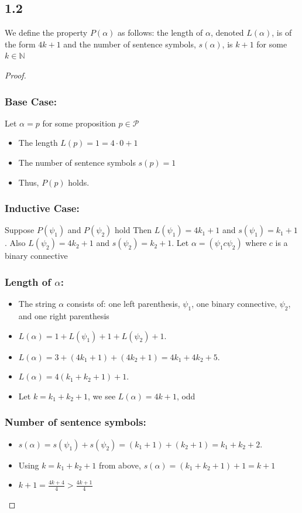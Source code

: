 \documentclass{article}
\begin{document}
\subsection*{1.2}

We define the property $P(\alpha)$ as follows: the length of $\alpha$, denoted $L(\alpha)$, 
is of the form $4k + 1$ and the number of sentence symbols, $s(\alpha)$, is $k+1$ for some $k \in \mathbb{N}$

\begin{proof}
\subsubsection*{Base Case:} Let $\alpha = p$ for some proposition $p \in \mathcal{P}$
\begin{itemize}
    \item The length $L(p) = 1 = 4\cdot 0 + 1$
    \item The number of sentence symbols $s(p) = 1$
    \item Thus, $P(p)$ holds.
\end{itemize}

\subsubsection*{Inductive Case:} Suppose $P(\psi_1)$ and $P(\psi_2)$ hold
Then $L(\psi_1) = 4k_1 + 1$ and $s(\psi_1) = k_1 + 1$.
Also $L(\psi_2) = 4k_2 + 1$ and $s(\psi_2) = k_2 + 1$.
Let $\alpha = (\psi_1 c \psi_2)$ where $c$ is a binary connective

\subsubsection*{Length of $\alpha$:}
\begin{itemize}
    \item The string $\alpha$ consists of: one left parenthesis, $\psi_1$, one binary connective, $\psi_2$, and one right parenthesis
    \item $L(\alpha) = 1 + L(\psi_1) + 1 + L(\psi_2) + 1$.
    \item $L(\alpha) = 3 + (4k_1 + 1) + (4k_2 + 1) = 4k_1 + 4k_2 + 5$.
    \item $L(\alpha) = 4(k_1 + k_2 + 1) + 1$.
    \item Let $k = k_1 + k_2 + 1$, we see $L(\alpha) = 4k + 1$, odd
\end{itemize}

\subsubsection*{Number of sentence symbols:}
\begin{itemize}
    \item $s(\alpha) = s(\psi_1) + s(\psi_2) = (k_1 + 1) + (k_2 + 1) = k_1 + k_2 + 2$.
    \item Using $k = k_1 + k_2 + 1$ from above, $s(\alpha) = (k_1 + k_2 + 1) + 1 = k + 1$
    \item $k + 1 = \frac{4k + 4}{4} > \frac{4k + 1}{4}$
\end{itemize}

\end{proof}
\end{document}
